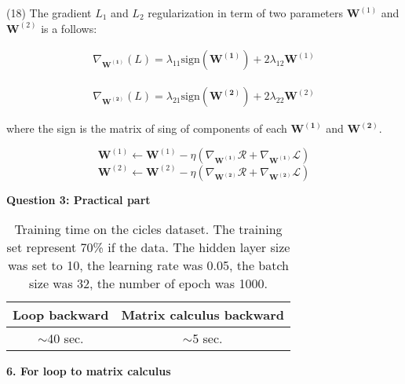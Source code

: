 \documentclass[11pt,english]{article}
\newcommand{\sign}{\mathrm{sign}}
\begin{document}
(18)
The gradient $L_1$ and $L_2$ regularization in term of two parameters $\bm{W}^{(1)}$ and $\bm{W}^{(2)}$ is a follows:

\begin{equation}
\begin{split}
\nabla_{\bm{W^{(1)}}}(L)= \lambda_{11}   \sign(\bm{W^{(1)}})+ 2\lambda_{12} {\bm{W}}^{(1)}
\end{split}
\end{equation}

\begin{equation}
\begin{split}
\nabla_{\bm{W^{(2)}}}(L)= \lambda_{21}   \sign(\bm{W^{(2)}})+ 2 \lambda_{22} {\bm{W}}^{(2)}
\end{split}
\end{equation}

where the sign is the matrix of sing of components of each $\bm{W^{(1)}}$ and $\bm{W^{(2)}}$. 

$$
\bm{W}^{(1)} \leftarrow \bm{W}^{(1)}- \eta \left( \nabla_{\bm{W^{(1)}}}\mathcal{R} + \nabla_{\bm{W^{(1)}}}\mathcal{L}\right)
$$
$$
\bm{W}^{(2)} \leftarrow \bm{W}^{(2)}- \eta \left( \nabla_{\bm{W^{(2)}}}\mathcal{R} + \nabla_{\bm{W^{(2)}}}\mathcal{L}\right)
$$


\textbf{Question 3: Practical part}\\

\begin{table}[h!]
	\centering
	\begin{tabular}{|c|c|}
		\hline 
		Loop backward & Matrix calculus backward \\ 
		\hline 
		$\sim$40 sec. & $\sim$5 sec. \\ 
		\hline 
	\end{tabular} 
	\caption{Training time on the cicles dataset. The training set represent 70\% if the data. The hidden layer size was set to 10, the learning rate was 0.05, the batch size was 32, the number of epoch was 1000.}
\end{table}

\newpage

\textbf{6. For loop to matrix calculus}
\end{document}
